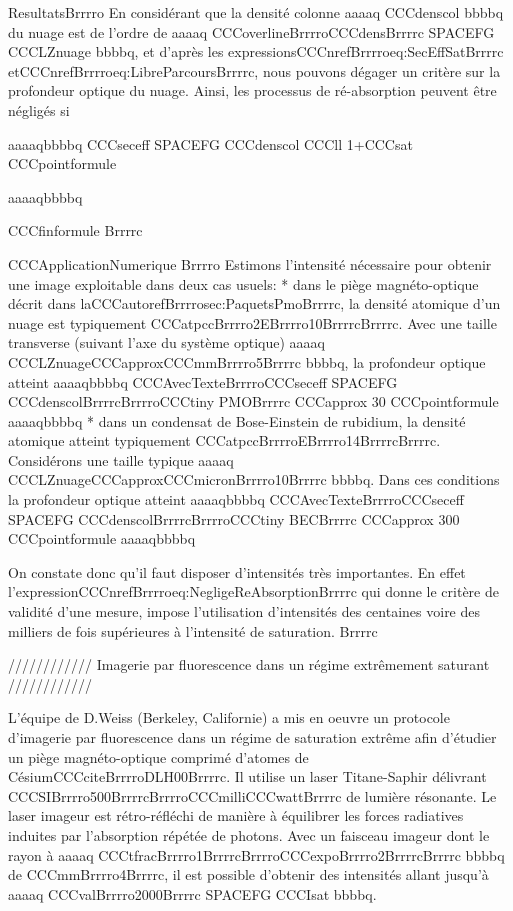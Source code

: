 ResultatsBrrrro
En considérant que la densité colonne aaaaq CCCdenscol bbbbq du nuage est de l'ordre de aaaaq CCCoverlineBrrrroCCCdensBrrrrc  SPACEFG  CCCLZnuage bbbbq, et d'après les expressionsCCCnrefBrrrroeq:SecEffSatBrrrrc etCCCnrefBrrrroeq:LibreParcoursBrrrrc, nous pouvons dégager un critère sur la profondeur optique du nuage.
Ainsi, les processus de ré-absorption peuvent être négligés si



aaaaqbbbbq
	CCCseceff  SPACEFG  CCCdenscol CCCll  1+CCCsat
	CCCpointformule
	
aaaaqbbbbq



CCCfinformule
Brrrrc



CCCApplicationNumerique
Brrrro
Estimons l'intensité nécessaire pour obtenir une image exploitable dans deux cas usuels:
	* dans le piège magnéto-optique décrit dans laCCCautorefBrrrrosec:PaquetsPmoBrrrrc,  la densité atomique d'un nuage est typiquement CCCatpccBrrrro2EBrrrro10BrrrrcBrrrrc. Avec une taille transverse (suivant l'axe du système optique) aaaaq CCCLZnuageCCCapproxCCCmmBrrrro5Brrrrc bbbbq, la profondeur optique atteint  
aaaaqbbbbq
CCCAvecTexteBrrrroCCCseceff  SPACEFG  CCCdenscolBrrrrcBrrrroCCCtiny PMOBrrrrc CCCapprox 30
CCCpointformule
aaaaqbbbbq
* dans un condensat de Bose-Einstein de rubidium, la densité atomique atteint typiquement CCCatpccBrrrroEBrrrro14BrrrrcBrrrrc. Considérons une taille typique aaaaq CCCLZnuageCCCapproxCCCmicronBrrrro10Brrrrc bbbbq. Dans ces conditions la profondeur optique atteint  
aaaaqbbbbq
CCCAvecTexteBrrrroCCCseceff  SPACEFG  CCCdenscolBrrrrcBrrrroCCCtiny BECBrrrrc CCCapprox 300
CCCpointformule
aaaaqbbbbq

On constate donc qu'il faut disposer d'intensités très importantes. En effet l'expressionCCCnrefBrrrroeq:NegligeReAbsorptionBrrrrc qui donne le critère de validité d'une mesure, impose l'utilisation d'intensités des centaines voire des milliers de fois supérieures à l'intensité de saturation.
Brrrrc


//////////// Imagerie par fluorescence dans un régime extrêmement saturant ////////////

L'équipe de D.Weiss (Berkeley, Californie) a mis en oeuvre un protocole d'imagerie par fluorescence dans un régime de saturation extrême  afin d'étudier un piège magnéto-optique comprimé d'atomes de CésiumCCCciteBrrrroDLH00Brrrrc. Il utilise un laser Titane-Saphir délivrant CCCSIBrrrro500BrrrrcBrrrroCCCmilliCCCwattBrrrrc de lumière résonante. Le laser imageur est rétro-réfléchi de manière à équilibrer les forces radiatives induites par l'absorption répétée de photons. Avec un faisceau imageur dont le rayon à aaaaq CCCtfracBrrrro1BrrrrcBrrrroCCCexpoBrrrro2BrrrrcBrrrrc bbbbq de CCCmmBrrrro4Brrrrc, il est possible d'obtenir des intensités allant jusqu'à aaaaq CCCvalBrrrro2000Brrrrc  SPACEFG  CCCIsat bbbbq. 

